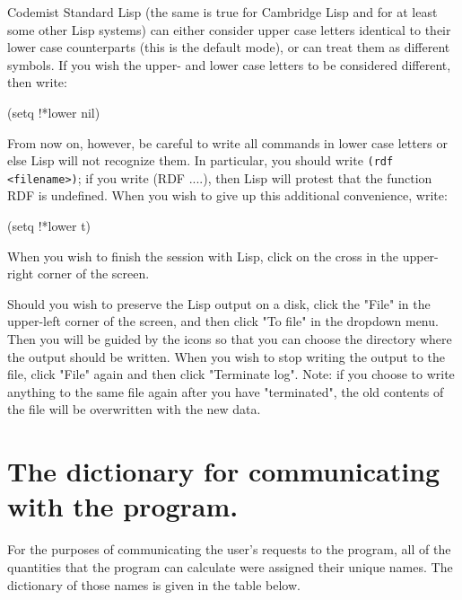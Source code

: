 Codemist Standard Lisp (the same is true for Cambridge Lisp and for at least
some other Lisp systems) can either consider upper case letters
     identical to their lower  case  counterparts  (this  is  the
     default mode), or can treat them as  different  symbols.  If
     you wish the upper- and lower case letters to be  considered
     different, then write:

\bigskip

     (setq !*lower nil)

\bigskip

     From now on, however, be careful to write  all  commands  in
     lower case letters or else Lisp will not recognize
them. In particular, you should write \verb+(rdf <filename>)+;  if you write
(RDF ....), then Lisp will protest that the function RDF is undefined. When you
     wish to give up this additional convenience, write:

\bigskip

     (setq !*lower t)

\bigskip

When you wish to finish the session with Lisp, click on the cross in the
upper-right corner of the screen.

Should you wish to preserve the Lisp output on a disk, click the "File" in the
upper-left corner of the screen, and then click "To file" in the dropdown menu.
Then you will be guided by the icons so that you can choose the directory where
the output should be written. When you wish to stop writing the output to the
file, click "File" again and then click "Terminate log". Note: if you choose to
write anything to the same file again after you have "terminated", the old
contents of the file will be overwritten with the new data.

\section{The dictionary for communicating with the program.}

For the purposes of communicating the  user's  requests
     to  the  program, all of the quantities that the program can
     calculate were assigned their unique names.  The  dictionary
     of those names is given in the table below.

\bigskip

